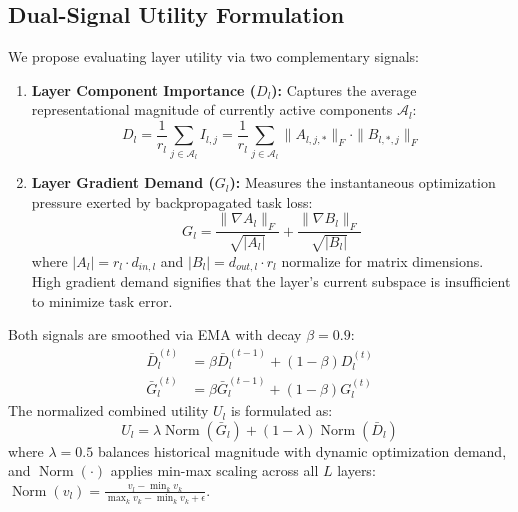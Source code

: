 \documentclass[conference]{IEEEtran}
\begin{document}
\subsection{Dual-Signal Utility Formulation}
We propose evaluating layer utility via two complementary signals:
\begin{enumerate}
  \item \textbf{Layer Component Importance ($D_l$):} Captures the average representational magnitude of currently active components $\mathcal{A}_l$:
  \begin{equation}
    D_l = \frac{1}{r_l} \sum_{j \in \mathcal{A}_l} I_{l,j} = \frac{1}{r_l} \sum_{j \in \mathcal{A}_l} \|A_{l,j,*}\|_F \cdot \|B_{l,*,j}\|_F
    \label{eq:signal_d}
  \end{equation}
  \item \textbf{Layer Gradient Demand ($G_l$):} Measures the instantaneous optimization pressure exerted by backpropagated task loss:
  \begin{equation}
    G_l = \frac{\|\nabla A_l\|_F}{\sqrt{|A_l|}} + \frac{\|\nabla B_l\|_F}{\sqrt{|B_l|}}
    \label{eq:signal_g}
  \end{equation}
  where $|A_l| = r_l \cdot d_{in,l}$ and $|B_l| = d_{out,l} \cdot r_l$ normalize for matrix dimensions. High gradient demand signifies that the layer's current subspace is insufficient to minimize task error.
\end{enumerate}

Both signals are smoothed via EMA with decay $\beta = 0.9$:
\begin{align}
  \bar{D}_l^{(t)} &= \beta \bar{D}_l^{(t-1)} + (1 - \beta) D_l^{(t)} \\
  \bar{G}_l^{(t)} &= \beta \bar{G}_l^{(t-1)} + (1 - \beta) G_l^{(t)}
\end{align}
The normalized combined utility $U_l$ is formulated as:
\begin{equation}
  U_l = \lambda \operatorname{Norm}(\bar{G}_l) + (1 - \lambda) \operatorname{Norm}(\bar{D}_l)
  \label{eq:utility}
\end{equation}
where $\lambda = 0.5$ balances historical magnitude with dynamic optimization demand, and $\operatorname{Norm}(\cdot)$ applies min-max scaling across all $L$ layers: $\operatorname{Norm}(v_l) = \frac{v_l - \min_k v_k}{\max_k v_k - \min_k v_k + \epsilon}$.
\end{document}
